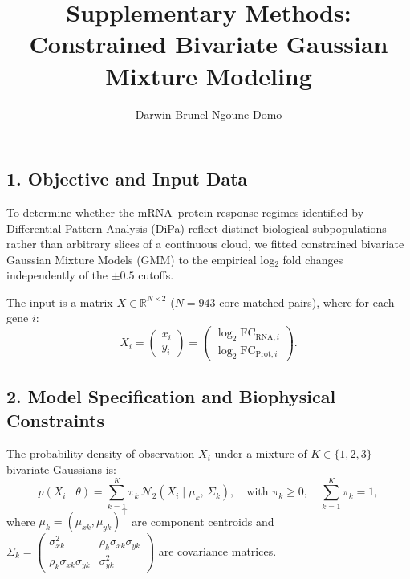 \documentclass[11pt,a4paper]{article}
\title{\textbf{Supplementary Methods: Constrained Bivariate Gaussian Mixture Modeling}}
\author{Darwin Brunel Ngoune Domo}
\date{}
\begin{document}
\maketitle
\vspace{-1.3cm}

\subsection*{1. Objective and Input Data}
To determine whether the mRNA--protein response regimes identified by Differential Pattern Analysis (DiPa) reflect distinct biological subpopulations rather than arbitrary slices of a continuous cloud, we fitted constrained bivariate Gaussian Mixture Models (GMM) to the empirical log$_2$ fold changes independently of the $\pm 0.5$ cutoffs. 

The input is a matrix $X \in \mathbb{R}^{N \times 2}$ ($N = 943$ core matched pairs), where for each gene $i$:
\begin{equation}
X_i = \begin{pmatrix} x_i \\ y_i \end{pmatrix} = \begin{pmatrix} \log_2\text{FC}_{\text{RNA}, i} \\ \log_2\text{FC}_{\text{Prot}, i} \end{pmatrix}.
\end{equation}

\subsection*{2. Model Specification and Biophysical Constraints}
The probability density of observation $X_i$ under a mixture of $K \in \{1, 2, 3\}$ bivariate Gaussians is:
\begin{equation}
p(X_i \mid \theta) = \sum_{k=1}^K \pi_k \, \mathcal{N}_2\left(X_i \mid \mu_k, \, \Sigma_k\right), \quad \text{with } \pi_k \ge 0, \quad \sum_{k=1}^K \pi_k = 1,
\end{equation}
where $\mu_k = (\mu_{xk}, \mu_{yk})^\top$ are component centroids and $\Sigma_k = \begin{pmatrix} \sigma_{xk}^2 & \rho_k \sigma_{xk}\sigma_{yk} \\ \rho_k \sigma_{xk}\sigma_{yk} & \sigma_{yk}^2 \end{pmatrix}$ are covariance matrices.
\end{document}
